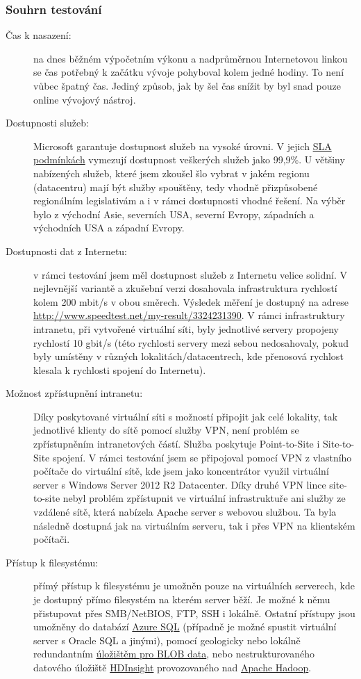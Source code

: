 \subsubsection{Souhrn testování}
\begin{description}
	\item [Čas k nasazení:] na dnes běžném výpočetním výkonu a nadprůměrnou Internetovou linkou se čas potřebný k začátku vývoje pohyboval kolem jedné hodiny. To není vůbec špatný čas. Jediný způsob, jak by šel čas snížit by byl snad pouze online vývojový nástroj.
	\item [Dostupnosti služeb:] Microsoft garantuje dostupnost služeb na vysoké úrovni. V jejich \href{http://www.windowsazure.com/en-us/support/legal/sla/}{SLA podmínkách\cite{azure:sla}} vymezují dostupnost veškerých služeb jako 99,9\%. U většiny nabízených služeb, které jsem zkoušel šlo vybrat v jakém regionu (datacentru) mají být služby spouštěny, tedy vhodně přizpůsobené regionálním legislativám a i v rámci dostupnosti vhodné řešení. Na výběr bylo z východní Asie, severních USA, severní Evropy, západních a východních USA a západní Evropy.
	\item [Dostupnosti dat z Internetu:] v rámci testování jsem měl dostupnost služeb z Internetu velice solidní. V nejlevnější variantě a zkušební verzi dosahovala infrastruktura rychlostí kolem 200 mbit/s v obou směrech. Výsledek měření je dostupný na adrese \href{http://www.speedtest.net/my-result/3324231390}{http://www.speedtest.net/my-result/3324231390}. V rámci infrastruktury intranetu, při vytvořené virtuální síti, byly jednotlivé servery propojeny rychlostí 10 gbit/s (této rychlosti servery mezi sebou nedosahovaly, pokud byly umístěny v různých lokalitách/datacentrech, kde přenosová rychlost klesala k rychlosti spojení do Internetu).
	\item [Možnost zpřístupnění intranetu:] Díky poskytované virtuální síti s možností připojit jak celé lokality, tak jednotlivé klienty do sítě pomocí služby VPN, není problém se zpřístupněním intranetových částí. Služba poskytuje Point-to-Site i Site-to-Site spojení. V rámci testování jsem se připojoval pomocí VPN z vlastního počítače do virtuální sítě, kde jsem jako koncentrátor využil virtuální server s Windows Server 2012 R2 Datacenter. Díky druhé VPN lince site-to-site nebyl problém zpřístupnit ve virtuální infrastruktuře ani služby ze vzdálené sítě, která nabízela Apache server s webovou službou. Ta byla následně dostupná jak na virtuálním serveru, tak i přes VPN na klientském počítači.
	\item [Přístup k filesystému:] přímý přístup k filesystému je umožněn pouze na virtuálních serverech, kde je dostupný přímo filesystém na kterém server běží. Je možné k němu přistupovat přes SMB/NetBIOS, FTP, SSH i lokálně. Ostatní přístupy jsou umožněny do databází \href{http://www.windowsazure.com/en-us/services/sql-database/}{Azure SQL} (případně je možné spustit virtuální server s Oracle SQL a jinými), pomocí geologicky nebo lokálně redundantním \href{http://www.windowsazure.com/en-us/services/storage/}{úložištěm pro BLOB data}, nebo nestrukturovaného datového úložiště \href{http://www.windowsazure.com/en-us/services/hdinsight/}{HDInsight} provozovaného nad \href{http://hadoop.apache.org/}{Apache Hadoop}.

\end{description}
